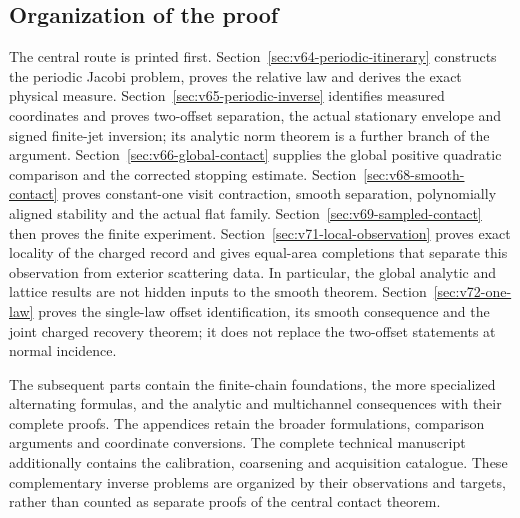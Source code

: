 \subsection{Organization of the proof}

The central route is printed first.  Section~\ref{sec:v64-periodic-itinerary}
constructs the periodic Jacobi problem, proves the relative law and derives
the exact physical measure.  Section~\ref{sec:v65-periodic-inverse}
identifies measured coordinates and proves two-offset separation, the
actual stationary envelope and signed finite-jet inversion; its analytic
norm theorem is a further branch of the argument.
Section~\ref{sec:v66-global-contact} supplies the global positive
quadratic comparison and the corrected stopping estimate.
Section~\ref{sec:v68-smooth-contact} proves constant-one visit contraction,
smooth separation, polynomially aligned stability and the actual flat
family.  Section~\ref{sec:v69-sampled-contact} then proves the finite
experiment.  Section~\ref{sec:v71-local-observation} proves exact
locality of the charged record and gives equal-area completions that
separate this observation from exterior scattering data.  In particular,
the global analytic and lattice results are
not hidden inputs to the smooth theorem.  Section~\ref{sec:v72-one-law}
proves the single-law offset identification, its smooth consequence and
the joint charged recovery theorem; it does not replace the two-offset
statements at normal incidence.

The subsequent parts contain the finite-chain foundations, the more
specialized alternating formulas, and the analytic and multichannel
consequences with their complete proofs.  The appendices retain the
broader formulations, comparison arguments and coordinate conversions.
The complete technical manuscript additionally contains the calibration,
coarsening and acquisition catalogue.  These complementary inverse
problems are organized by their observations and targets, rather than
counted as separate proofs of the central contact theorem.
